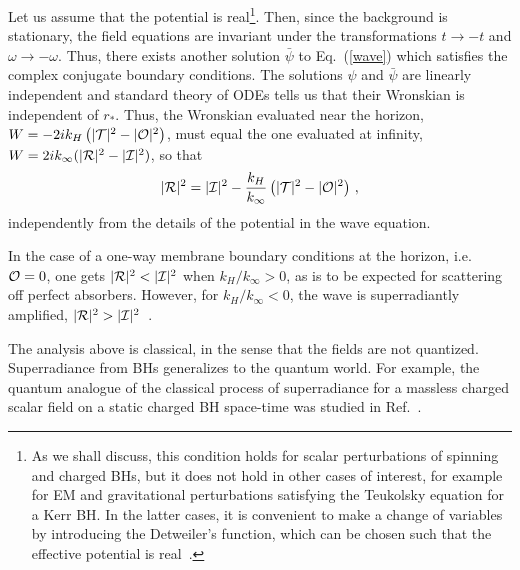 \documentclass[11pt]{article}
\numberwithin{equation}{section} %
\begin{document}
Let us assume that the potential is real\footnote{As we shall discuss, this condition holds for scalar 
perturbations of spinning and charged BHs, but it does not hold in other cases of interest, for example for 
EM and gravitational perturbations satisfying the Teukolsky equation for a Kerr BH. In the latter cases, 
it is convenient to make a change of variables by introducing the Detweiler's 
function, which can be chosen such that the effective potential is real~\cite{1977RSPSA.352..381D,Maggio:2018ivz}.}. 
Then, since the background is stationary, the field equations are invariant under the transformations $t\to -t$ and 
$\omega\to-\omega$. Thus, there exists another solution $\bar\psi$ to Eq.~(\ref{wave}) which satisfies the complex 
conjugate boundary conditions. 
%
The solutions $\psi$ and $\bar\psi$ are linearly independent and standard theory of ODEs tells us that their Wronskian is independent of $r_*$. Thus, the Wronskian evaluated near the horizon, $W= -2i k_H\left(|{\cal T}|^2-|{\cal O}|^2\right)$, must equal the one evaluated at infinity, $W=2i k_\infty(|{\cal R}|^2-|{\cal I}|^2)$, so that 
\begin{equation}
 |{\cal R}|^2=|{\cal I}|^2-\frac{k_H}{k_\infty}\left(|{\cal T}|^2-|{\cal O}|^2\right)\,,\label{reflectivity}
\end{equation}
independently from the details of the potential in the wave equation.

In the case of a one-way membrane boundary conditions at the horizon, i.e. ${\cal O}=0$, one gets $|{\cal R}|^2<|{\cal I}|^2$ when $k_H/k_\infty>0$, as is to be expected for scattering off perfect absorbers. However, for $k_H/k_\infty<0$, the wave is superradiantly amplified, $|{\cal R}|^2>|{\cal I}|^2$~\cite{Teukolsky:1974yv}. 


The analysis above is classical, in the sense that the fields are not quantized. Superradiance from BHs generalizes to the quantum world.
For example, the quantum analogue of the classical process of superradiance for a massless charged scalar field on a static charged BH space-time was studied in Ref.~\cite{Balakumar:2020gli}.




\end{document}

